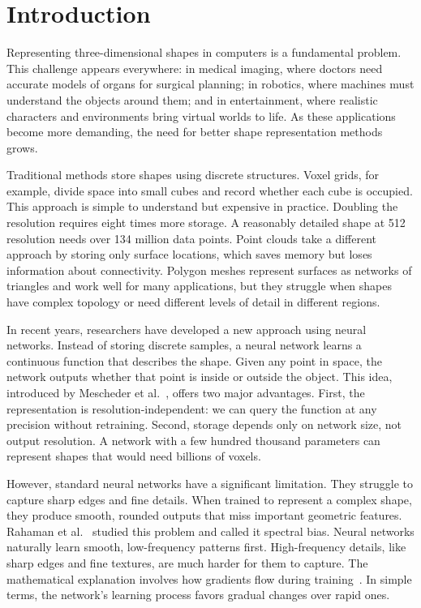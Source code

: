 \chapter{Introduction}
\label{ch:introduction}

Representing three-dimensional shapes in computers is a fundamental problem. This challenge appears everywhere: in medical imaging, where doctors need accurate models of organs for surgical planning; in robotics, where machines must understand the objects around them; and in entertainment, where realistic characters and environments bring virtual worlds to life. As these applications become more demanding, the need for better shape representation methods grows.

Traditional methods store shapes using discrete structures. Voxel grids, for example, divide space into small cubes and record whether each cube is occupied. This approach is simple to understand but expensive in practice. Doubling the resolution requires eight times more storage. A reasonably detailed shape at 512 resolution needs over 134 million data points. Point clouds take a different approach by storing only surface locations, which saves memory but loses information about connectivity. Polygon meshes represent surfaces as networks of triangles and work well for many applications, but they struggle when shapes have complex topology or need different levels of detail in different regions.

In recent years, researchers have developed a new approach using neural networks. Instead of storing discrete samples, a neural network learns a continuous function that describes the shape. Given any point in space, the network outputs whether that point is inside or outside the object. This idea, introduced by Mescheder et al.~\cite{mescheder2019occupancy}, offers two major advantages. First, the representation is resolution-independent: we can query the function at any precision without retraining. Second, storage depends only on network size, not output resolution. A network with a few hundred thousand parameters can represent shapes that would need billions of voxels.

However, standard neural networks have a significant limitation. They struggle to capture sharp edges and fine details. When trained to represent a complex shape, they produce smooth, rounded outputs that miss important geometric features. Rahaman et al.~\cite{rahaman2019spectral} studied this problem and called it spectral bias. Neural networks naturally learn smooth, low-frequency patterns first. High-frequency details, like sharp edges and fine textures, are much harder for them to capture. The mathematical explanation involves how gradients flow during training~\cite{jacot2018ntk}. In simple terms, the network's learning process favors gradual changes over rapid ones.

